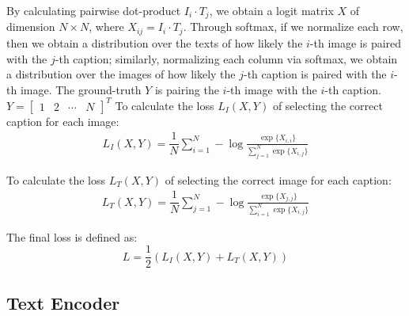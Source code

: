 By calculating pairwise dot-product $I_i \cdot T_j$, we obtain a logit matrix $X$ of dimension $N\times N$, where $X_{ij} = I_i \cdot T_j$. Through softmax, if we normalize each row, then we obtain a distribution over the texts of how likely the $i$-th image is paired with the $j$-th caption; similarly, normalizing each column via softmax, we obtain a distribution over the images of how likely the $j$-th caption is paired with the $i$-th image.   
The ground-truth $Y$ is pairing the $i$-th image with the $i$-th caption.  
$Y = \begin{bmatrix}1 & 2 & \cdots & N \end{bmatrix}^T $ 
To calculate the loss $L_I(X, Y)$ of selecting the correct caption for each image:
\begin{equation}
\begin{split}
    L_I(X, Y) = \dfrac{1}{N} \sum_{i=1}^N -\log\frac{\exp\{ {X}_{i,i} \}}{ \sum_{j=1}^N \exp\{ {X}_{i,j} \} }
\end{split}
\end{equation}

To calculate the loss $L_T(X, Y)$ of selecting the correct image for each caption:
\begin{equation}
\begin{split}
    L_T(X, Y) = \dfrac{1}{N} \sum_{j=1}^N -\log\frac{\exp\{ {X}_{j,j} \}}{ \sum_{i=1}^N \exp\{ {X}_{i,j} \} }
\end{split}
\end{equation}


The final loss is defined as:
$$L = \dfrac{1}{2} (L_I(X, Y) + L_T(X, Y))$$


\subsection{Text Encoder}

